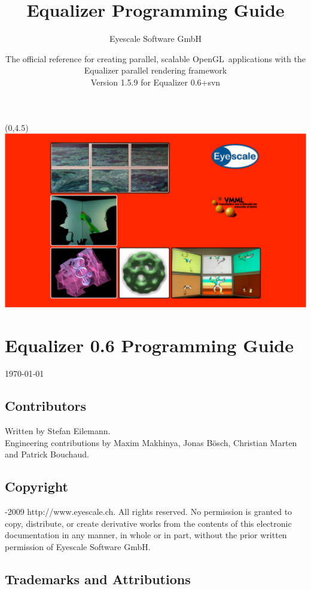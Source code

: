 \documentclass[10pt,a4]{scrartcl}
\title{Equalizer Programming Guide}
\author{Eyescale Software GmbH}
\date{
  \vspace{15cm}
  {\Large\sffamily The official reference for creating parallel,
    scalable OpenGL\texttrademark\ applications with the Equalizer
    parallel rendering framework}\\\vspace{1cm}
  Version 1.5.9 for Equalizer 0.6+svn\\[\medskipamount]
}
\begin{document}
\pagestyle{empty}
\maketitle
\thispagestyle{empty}
\begin{textblock}{}(0,4.5)
  \hspace{-1cm}\includegraphics[width=22cm]{images/teaser.pdf}
\end{textblock}

\clearpage

\lstset{language=C++}
\section*{Equalizer 0.6 Programming Guide}
\today
\subsection*{Contributors}

Written by Stefan Eilemann.\\
Engineering contributions by Maxim Makhinya, Jonas B\"osch, Christian
Marten and Patrick Bouchaud.

\subsection*{Copyright}

-2009 
{http://www.eyescale.ch}. All rights reserved. No permission is
granted to copy, distribute, or create derivative works from the
contents of this electronic documentation in any manner, in whole or in
part, without the prior written permission of Eyescale Software GmbH.

\subsection*{Trademarks and Attributions}
\end{document}

